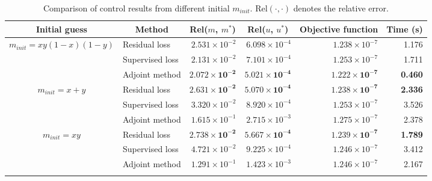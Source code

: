 \documentclass[letterpaper]{article}
\begin{document}
\begin{table}[t]
\centering
\begin{tabular}{clrrrr}

  \Xhline{1pt}
Initial guess &
  \multicolumn{1}{c}{Method} &
  \multicolumn{1}{c}{Rel($m$, $m^*$)} &
  \multicolumn{1}{c}{Rel($u$, $u^*$)} &
  \multicolumn{1}{c}{Objective function} &
  \multicolumn{1}{c}{Time (s)} \\ \hline
\multirow{3}{*}{$m_{init}= xy(1-x)(1-y)$} & Residual loss    & $2.531\times10^{-2}$ & $6.098\times10^{-4}$ & $1.238\times10^{-7}$ & 1.176  \\
                                  & Supervised loss  & $2.131\times10^{-2}$ & $7.101\times10^{-4}$ & $1.253\times10^{-7}$ & 1.711 \\
                                  & Adjoint method & $\pmb{2.072\times10^{-2}}$ & $\pmb{5.021\times10^{-4}}$ & $\pmb{1.222\times10^{-7}}$ & \textbf{0.460}  \\ \hline
\multirow{3}{*}{$m_{init} = x + y$}      & Residual loss    & $\pmb{2.631\times10^{-2}}$ & $\pmb{5.070\times10^{-4}}$ & $\pmb{1.238\times10^{-7}}$ & \textbf{2.336}  \\
                                  & Supervised loss  & $3.320\times10^{-2}$ & $8.920\times10^{-4}$ & $1.253\times10^{-7}$ & 3.526 \\
                                  & Adjoint method & $1.615\times10^{-1}$ & $2.715\times10^{-3}$ & $1.275\times10^{-7}$ & 2.378  \\ \hline
\multirow{3}{*}{$m_{init} = xy$}         & Residual loss    & $\pmb{2.738\times10^{-2}}$ & $\pmb{5.667\times10^{-4}}$ & $\pmb{1.239\times10^{-7}}$ & \textbf{1.789}  \\
                                  & Supervised loss  & $4.721\times10^{-2}$ & $9.225\times10^{-4}$ & $1.246\times10^{-7}$ & 3.412 \\
                                  & Adjoint method & $1.291\times10^{-1}$ & $1.423\times10^{-3}$ & $1.246\times10^{-7}$ & 2.167 \\ 
  \Xhline{1pt}
\end{tabular}
\caption{Comparison of control results from different initial $m_{init}$. Rel$(\cdot,\cdot)$ denotes the relative error.}
\label{poisson_table}
\end{table}
\end{document}
